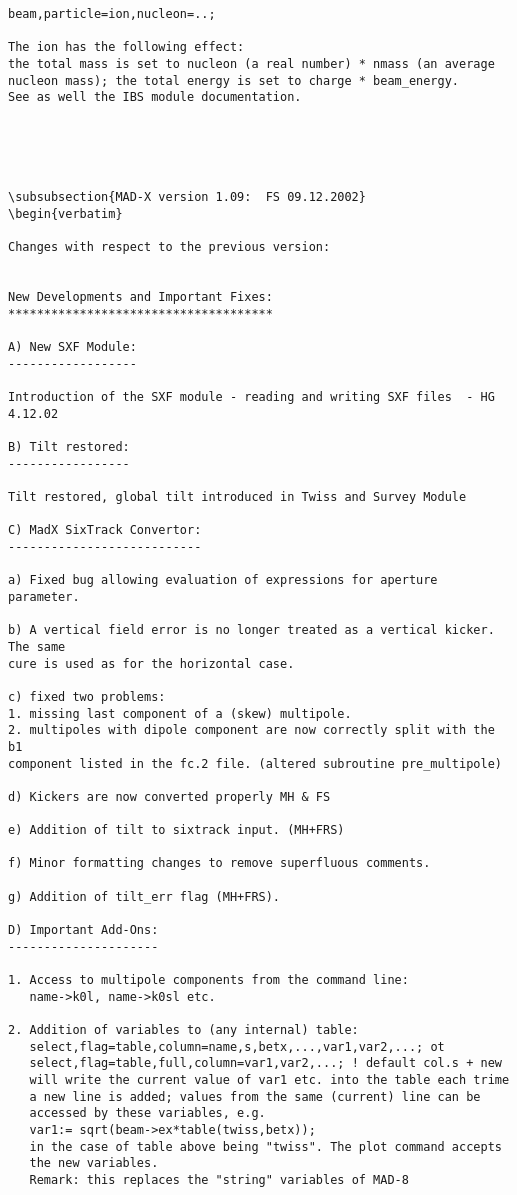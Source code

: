 \begin{verbatim}
beam,particle=ion,nucleon=..;

The ion has the following effect:
the total mass is set to nucleon (a real number) * nmass (an average
nucleon mass); the total energy is set to charge * beam_energy.
See as well the IBS module documentation.





\subsubsection{MAD-X version 1.09:  FS 09.12.2002}
\begin{verbatim}

Changes with respect to the previous version:


New Developments and Important Fixes:
*************************************

A) New SXF Module:
------------------

Introduction of the SXF module - reading and writing SXF files  - HG 4.12.02

B) Tilt restored:
-----------------

Tilt restored, global tilt introduced in Twiss and Survey Module

C) MadX SixTrack Convertor:
---------------------------

a) Fixed bug allowing evaluation of expressions for aperture parameter.

b) A vertical field error is no longer treated as a vertical kicker. The same
cure is used as for the horizontal case.

c) fixed two problems:
1. missing last component of a (skew) multipole.
2. multipoles with dipole component are now correctly split with the b1 
component listed in the fc.2 file. (altered subroutine pre_multipole)

d) Kickers are now converted properly MH & FS

e) Addition of tilt to sixtrack input. (MH+FRS)

f) Minor formatting changes to remove superfluous comments.

g) Addition of tilt_err flag (MH+FRS).

D) Important Add-Ons:
---------------------

1. Access to multipole components from the command line:  
   name->k0l, name->k0sl etc.

2. Addition of variables to (any internal) table:
   select,flag=table,column=name,s,betx,...,var1,var2,...; ot
   select,flag=table,full,column=var1,var2,...; ! default col.s + new
   will write the current value of var1 etc. into the table each trime
   a new line is added; values from the same (current) line can be
   accessed by these variables, e.g.
   var1:= sqrt(beam->ex*table(twiss,betx));
   in the case of table above being "twiss". The plot command accepts
   the new variables.
   Remark: this replaces the "string" variables of MAD-8


\end{verbatim}
